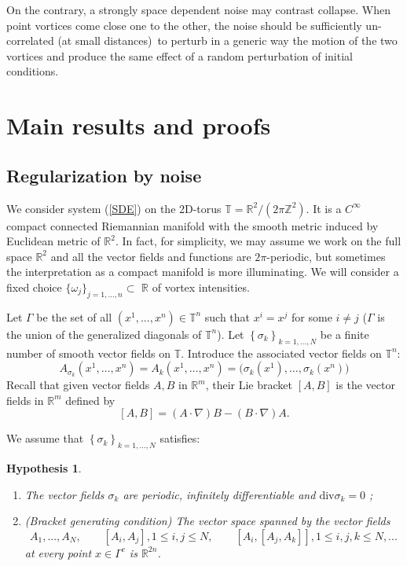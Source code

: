 \documentclass[11pt,a4paper]{article}%
\newtheorem{hypothesis}{Hypothesis}
\begin{document}
On the contrary, a strongly space dependent noise may contrast collapse. When
point vortices come close one to the other, the noise should be sufficiently
un-correlated (at small distances)\ to perturb in a generic way the motion of
the two vortices and produce the same effect of a random perturbation of
initial conditions.

\section{Main results and proofs}
\label{sec:main}
\subsection{Regularization by noise}\label{section assumptions}

We consider system (\ref{SDE}) on the 2D-torus
$\mathbb{T}=\mathbb{R}^{2}/( 2\pi\mathbb{Z}^{2}) $. It is a
$C^{\infty}$  compact connected Riemannian manifold with the smooth
metric induced by Euclidean metric of $\mathbb{R}^{2}$. In fact, for
simplicity, we may assume we work on the full space $\mathbb{R}^{2}$
and all the vector fields and functions are $2\pi $-periodic, but
sometimes the interpretation as a compact manifold is more
illuminating. We will consider a fixed choice $\{ \omega_{j}\}
_{j=1,...,n}\subset$ $\mathbb{R}$ of vortex intensities.

Let $\Gamma$ be the set of all $\left(  x^{1},...,x^{n}\right)  \in
{\mathbb{T}}^{n}$ such that $x^{i}=x^{j}$ for some $i\neq j$  ($\Gamma$  is
the union of the generalized diagonals of $\mathbb{T}^{n}$).
Let $\left\{  \sigma_{k}\right\}  _{k=1,...,N}$ be a finite number of smooth
vector fields on ${\mathbb{T}}$. Introduce the associated vector fields on
$\mathbb{T}^{n}$:
\begin{equation}
A_{\sigma_{k}}(x^{1},\ldots,x^{n})=A_{k}(x^{1},\ldots,x^{n})=\big(\sigma
_{k}(x^{1}),\ldots,\sigma_{k}(x^{n})\big)\label{dopo}%
\end{equation}
Recall that given vector fields $A,B$ in $\mathbb{R}^{m}$, their Lie bracket $[A,B]$ is the vector fields in
$\mathbb{R}^{m}$ defined by
\[
[ A,B] =( A\cdot\nabla) B-( B\cdot\nabla) A.
\]

We assume that $\left\{  \sigma_{k}\right\}  _{k=1,...,N}$ satisfies:

\begin{hypothesis}
\label{r}
\parbox{0cm}{}
\begin{enumerate}
\item The vector fields $\sigma_{k}$ are periodic, infinitely differentiable and $\mathrm{div}%
\sigma_{k}=0$ ;

\item (Bracket  generating condition) The vector space spanned by the vector fields
\[
A_{1},...,A_{N},\qquad[ A_{i},A_{j}] ,1\leq i,j\leq N,\qquad[ A_{i},[
A_{j},A_{k}] ] ,1\leq i,j,k\leq N,...
\]
at every point $x\in\Gamma^{c}$ is $\mathbb{R}^{2n}$.
\end{enumerate}
\end{hypothesis}
\end{document}
